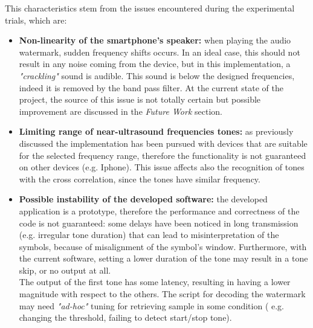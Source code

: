 This characteristics stem from the issues encountered during the experimental trials, which are:
\begin{itemize}
    \item \textbf{Non-linearity of the smartphone's speaker:} when playing the audio watermark, sudden frequency shifts occurs. In an ideal case, this should not result in any noise coming from the device, but in this implementation,  a \textit{"crackling"} sound is audible. This sound is below the designed frequencies, indeed it is removed by the band pass filter. 
    At the current state of the project, the source of this issue is not totally certain but possible improvement are discussed in the \textit{Future Work} section.
    \item \textbf{Limiting range of near-ultrasound frequencies tones:} as previously discussed the implementation has been pursued with devices that are suitable for the selected frequency range, therefore the functionality is not guaranteed on other devices (e.g. Iphone). This issue affects also the recognition of tones with the cross correlation, since the tones have similar frequency.
    \item \textbf{Possible instability of the developed software:} the developed application is a prototype, therefore the performance and correctness of the code is not guaranteed: some delays have been noticed in long transmission (e.g. irregular tone duration) that can lead to misinterpretation of the symbols, because of misalignment of the symbol's window.
    Furthermore, with the current software, setting a lower duration of the tone may result in a tone skip, or no output at all.\\
    The output of the first tone has some latency, resulting in having a lower magnitude with respect to the others.
    The script for decoding the watermark may need \textit{"ad-hoc"} tuning for retrieving sample in some condition ( e.g. changing the threshold, failing to detect start/stop tone).

    
\end{itemize}

